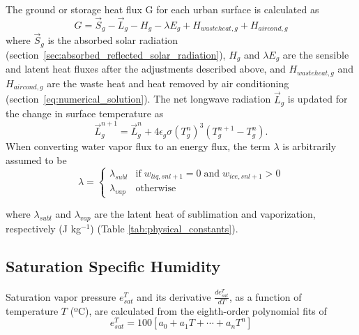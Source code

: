 \documentclass[12pt,authoryear]{elsarticle}
\numberwithin{equation}{section} %
\begin{document}
The ground or storage heat flux G for each urban surface is calculated as
\begin{equation}
G = \overrightarrow{S}_{g}-\overrightarrow{L}_{g}-H_{g}-\lambda E_{g} +H_{wasteheat,g}+H_{aircond,g}
\end{equation}
where $\overrightarrow{S}_{g}$ is the absorbed solar radiation (section~\ref{sec:absorbed_reflected_solar_radiation}), $H_{g}$ and $\lambda E_{g}$ are the sensible and latent heat fluxes after the adjustments described above, and $H_{wasteheat,g}$ and $H_{aircond,g}$ are the waste heat and heat removed by air conditioning (section~\ref{eq:numerical_solution}). The net longwave radiation $\overrightarrow{L}_{g}$ is updated for the change in surface temperature as 
\begin{equation}
\overrightarrow{L}_{g}^{n+1} = \overrightarrow{L}_{g}^{n}+4\epsilon_{g}\sigma(T_{g}^{n})^3(T_{g}^{n+1}-T_{g}^{n}).
\end{equation}
When converting water vapor flux to an energy flux, the term $\lambda$ is arbitrarily assumed to be
\begin{equation}
\lambda=
\begin{cases}
\lambda_{subl} & \textrm{if} \;w_{liq,snl+1}=0\; \textrm{and} \; w_{ice,snl+1}>0 \\
\lambda_{vap} & \textrm{otherwise}
\end{cases}
\end{equation}

where $\lambda_{subl}$ and $\lambda_{vap}$ are the latent heat of sublimation and vaporization, respectively (J kg$^{-1}$) (Table \ref{tab:physical_constants}).

\subsection{Saturation Specific Humidity}
\label{sec:saturation_specific_humidity}
%
Saturation vapor pressure $e_{sat}^{T}$ and its derivative $\frac{d e_{sat}^{T}}{d T}$, as a function of temperature $T$ (ºC), are calculated from the eighth-order polynomial fits of \cite{flatauPolynomialFitsSaturation1992}
\begin{equation}
e_{sat}^{T} = 100\left[a_{0}+a_{1}T+\cdots+a_{n}T^{n}\right]
\end{equation}
\end{document}
